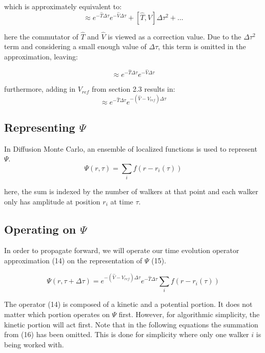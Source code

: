 \documentclass{article}
\begin{document}
which is approximately equivalent to: 
\begin{equation} \label{eqn}
\approx{e^{-\hat{T}\Delta\tau}e^{-\hat{V}\Delta\tau}+[\hat{T},\hat{V}]\Delta\tau^2+...}
\end{equation}

here the commutator of $\hat{T}$ and $\hat{V}$ is viewed as a correction value. Due to the $\Delta\tau^2$ term and considering a small enough value of $\Delta\tau$, this term is omitted in the approximation, leaving:

\begin{equation} \label{eqn}
\approx{e^{-\hat{T}\Delta\tau}e^{-\hat{V}\Delta\tau}}
\end{equation}

furthermore, adding in $V_{ref}$ from section 2.3 results in:
\begin{equation} \label{eqn}
\approx{e^{-\hat{T}\Delta\tau}e^{-(\hat{V}-V_{ref})\Delta\tau}}
\end{equation}

\subsection{Representing $\Psi$}
In Diffusion Monte Carlo, an ensemble of localized functions is used to represent $\Psi$.
\begin{equation} \label{eqn}
\Psi(r,\tau)=\sum_{i}f(r-r_{i}(\tau))
\end{equation}

here, the sum is indexed by the number of walkers at that point and each walker only has amplitude at position $r_{i}$ at time $\tau$. 

\subsection{Operating on $\Psi$}
In order to propagate forward, we will operate our time evolution operator approximation (14) on the representation of $\Psi$ (15).  

\begin{equation} \label{eqn}
\Psi(r,\tau+\Delta\tau)=e^{-(\hat{V}-V_{ref})\Delta\tau}e^{-\hat{T}\Delta\tau}\sum_{i}f(r-r_{i}(\tau))
\end{equation}

The operator (14) is composed of a kinetic and a potential portion. 
It does not matter which portion operates on $\Psi$ first. 
However, for algorithmic simplicity, the kinetic portion will act first. 
Note that in the following equations the summation from (16) has been omitted. 
This is done for simplicity where only one walker $i$ is being worked with.
\end{document}
